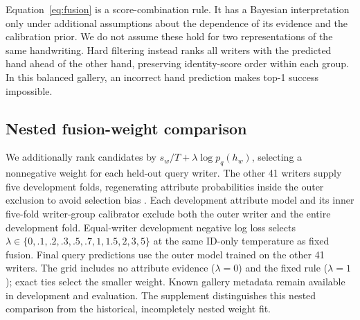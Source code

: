 \documentclass[5p,times,twocolumn,final,numbers,sort&compress]{elsarticle}
\begin{document}
Equation~\eqref{eq:fusion} is a score-combination rule. It has a Bayesian interpretation only under additional assumptions about the dependence of its evidence and the calibration prior. We do not assume these hold for two representations of the same handwriting. Hard filtering instead ranks all writers with the predicted hand ahead of the other hand, preserving identity-score order within each group. In this balanced gallery, an incorrect hand prediction makes top-1 success impossible.

\subsection{Nested fusion-weight comparison}
\label{sec:nested}
We additionally rank candidates by $s_w/T+\lambda\log p_q(h_w)$, selecting a nonnegative weight for each held-out query writer. The other 41 writers supply five development folds, regenerating attribute probabilities inside the outer exclusion to avoid selection bias \cite{cawley2010selection}. Each development attribute model and its inner five-fold writer-group calibrator exclude both the outer writer and the entire development fold. Equal-writer development negative log loss selects $\lambda\in\{0,.1,.2,.3,.5,.7,1,1.5,2,3,5\}$ at the same ID-only temperature as fixed fusion. Final query predictions use the outer model trained on the other 41 writers. The grid includes no attribute evidence ($\lambda=0$) and the fixed rule ($\lambda=1$); exact ties select the smaller weight. Known gallery metadata remain available in development and evaluation. The supplement distinguishes this nested comparison from the historical, incompletely nested weight fit.
\end{document}
